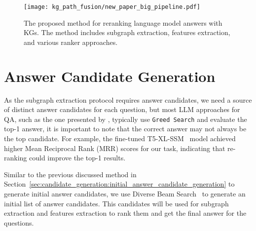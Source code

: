 \begin{figure}[htb]
    \centering
    \texttt{[image: kg\_path\_fusion/new\_paper\_big\_pipeline.pdf]}
    \caption{The proposed method for reranking language model answers with KGs. The method includes subgraph extraction, features extraction, and various ranker approaches.}
    \label{fig:controllable_fusion:big_pipe}
\end{figure}

\section{Answer Candidate Generation}
\label{sec:controllable_fusion:answer_candidate_generation}

As the subgraph extraction protocol requires answer candidates, we need a source of distinct answer candidates for each question, but most LLM approaches for QA, such as the one presented by \cite{DBLP:conf/coling/SenAS22-mintaka}, typically use \texttt{Greed Search} and evaluate the top-1 answer, it is important to note that the correct answer may not always be the top candidate. For example, the fine-tuned T5-XL-SSM~\cite{DBLP:conf/emnlp/RobertsRS20} model achieved higher Mean Reciprocal Rank (MRR) scores for our task, indicating that re-ranking could improve the top-1 results. 

Similar to the previous discussed method in Section~\ref{sec:candidate_generation:initial_answer_candidate_generation} to generate initial answer candidates, we use Diverse Beam Search~\cite{DBLP:journals/corr/VijayakumarCSSL16-diverse-beam-search} to generate an initial list of answer candidates. This candidates will be used for subgraph extraction and features extraction to rank them and get the final answer for the questions.
  



